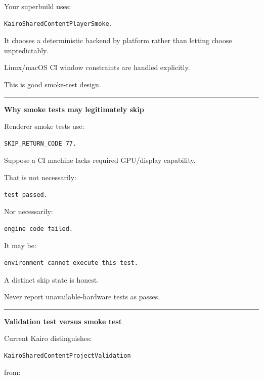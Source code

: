 Your superbuild uses:

\begin{verbatim}
KairoSharedContentPlayerSmoke.
\end{verbatim}

It chooses a deterministic backend by platform rather than letting  choose unpredictably.

Linux/macOS CI window constraints are handled explicitly.

This is good smoke-test design.

\begin{center}\rule{0.5\linewidth}{0.5pt}\end{center}

\textbf{Why smoke tests may legitimately skip}

Renderer smoke tests use:

\begin{verbatim}
SKIP_RETURN_CODE 77.
\end{verbatim}

Suppose a CI machine lacks required GPU/display capability.

That is not necessarily:

\begin{verbatim}
test passed.
\end{verbatim}

Nor necessarily:

\begin{verbatim}
engine code failed.
\end{verbatim}

It may be:

\begin{verbatim}
environment cannot execute this test.
\end{verbatim}

A distinct skip state is honest.

Never report unavailable-hardware tests as passes.

\begin{center}\rule{0.5\linewidth}{0.5pt}\end{center}

\textbf{Validation test versus smoke test}

Current Kairo distinguishes:

\begin{verbatim}
KairoSharedContentProjectValidation
\end{verbatim}

from:

